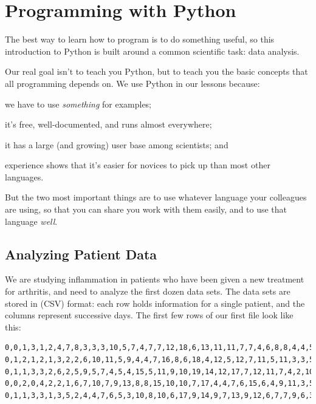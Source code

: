 \documentclass{book}
\begin{document}
\chapter{Programming with Python}\label{s:python}

The best way to learn how to program is to do something useful, so this
introduction to Python is built around a common scientific task: data
analysis.

Our real goal isn't to teach you Python, but to teach you the basic
concepts that all programming depends on. We use Python in our lessons
because:

\begin{swcenumerate}
\item
  we have to use \emph{something} for examples;
\item
  it's free, well-documented, and runs almost everywhere;
\item
  it has a large (and growing) user base among scientists; and
\item
  experience shows that it's easier for novices to pick up than most
  other languages.
\end{swcenumerate}

But the two most important things are to use whatever language your
colleagues are using, so that you can share you work with them easily,
and to use that language \emph{well}.

\section{Analyzing Patient Data}

We are studying inflammation in patients who have been given a new
treatment for arthritis, and need to analyze the first dozen data sets.
The data sets are stored in 
(CSV) format: each row holds information for a single patient, and the
columns represent successive days. The first few rows of our first file
look like this:

\begin{verbatim}
0,0,1,3,1,2,4,7,8,3,3,3,10,5,7,4,7,7,12,18,6,13,11,11,7,7,4,6,8,8,4,4,5,7,3,4,2,3,0,0
0,1,2,1,2,1,3,2,2,6,10,11,5,9,4,4,7,16,8,6,18,4,12,5,12,7,11,5,11,3,3,5,4,4,5,5,1,1,0,1
0,1,1,3,3,2,6,2,5,9,5,7,4,5,4,15,5,11,9,10,19,14,12,17,7,12,11,7,4,2,10,5,4,2,2,3,2,2,1,1
0,0,2,0,4,2,2,1,6,7,10,7,9,13,8,8,15,10,10,7,17,4,4,7,6,15,6,4,9,11,3,5,6,3,3,4,2,3,2,1
0,1,1,3,3,1,3,5,2,4,4,7,6,5,3,10,8,10,6,17,9,14,9,7,13,9,12,6,7,7,9,6,3,2,2,4,2,0,1,1
\end{verbatim}
\end{document}
